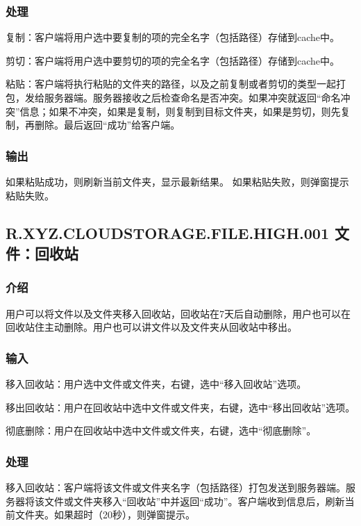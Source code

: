 \subsubsection{处理}
复制：客户端将用户选中要复制的项的完全名字（包括路径）存储到cache中。

剪切：客户端将用户选中要剪切的项的完全名字（包括路径）存储到cache中。

粘贴：客户端将执行粘贴的文件夹的路径，以及之前复制或者剪切的类型一起打包，发给服务器端。服务器接收之后检查命名是否冲突。如果冲突就返回“命名冲突”信息；如果不冲突，如果是复制，则复制到目标文件夹，如果是剪切，则先复制，再删除。最后返回“成功”给客户端。

\subsubsection{输出}
如果粘贴成功，则刷新当前文件夹，显示最新结果。
如果粘贴失败，则弹窗提示粘贴失败。




\subsection{R.XYZ.CLOUDSTORAGE.FILE.HIGH.001 文件：回收站}

\subsubsection{介绍} 
用户可以将文件以及文件夹移入回收站，回收站在7天后自动删除，用户也可以在回收站住主动删除。用户也可以讲文件以及文件夹从回收站中移出。

\subsubsection{输入} 
移入回收站：用户选中文件或文件夹，右键，选中“移入回收站”选项。

移出回收站：用户在回收站中选中文件或文件夹，右键，选中“移出回收站”选项。

彻底删除：用户在回收站中选中文件或文件夹，右键，选中“彻底删除”。

\subsubsection{处理} 
移入回收站：客户端将该文件或文件夹名字（包括路径）打包发送到服务器端。服务器将该文件或文件夹移入“回收站”中并返回“成功”。客户端收到信息后，刷新当前文件夹。如果超时（20秒），则弹窗提示。

